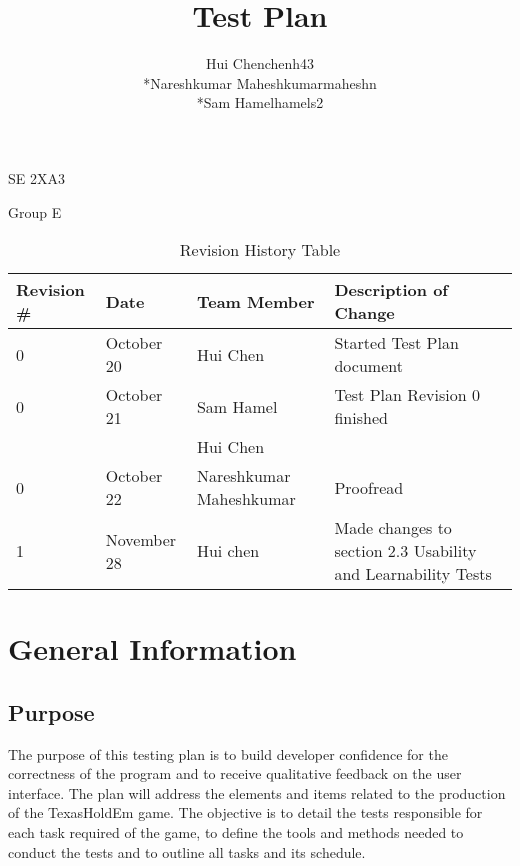 \documentclass[12pt]{article}
\begin{document}
	\begin{titlepage}
	\title {Test Plan}
	\maketitle
		\begin{center}
		SE 2XA3\\
		\author{
		Hui Chen\hspace{128pt}chenh43	
		\\*Nareshkumar Maheshkumar\hspace{35pt}maheshn 
		\\*Sam Hamel\hspace{118pt}hamels2 \\
		}

		Group E
		\end{center}
	\end{titlepage}
	
	\newpage
	\tableofcontents
	\listoftables
	
	\newpage
	\begin{table}[h]
	\caption{Revision History Table}
	\begin{tabular}{|p{1.5cm}|l|p{3cm}|p{6cm}|}
  	\hline
  	Revision \# & Date & Team Member & Description of Change\\
  	\hline
  	0 & October 20 & Hui Chen & Started Test Plan document\\
  	\hline
  	0 & October 21 & Sam Hamel  & Test Plan Revision 0 finished\\
  	 & & Hui Chen & \\
  	\hline
  	0 & October 22 & Nareshkumar Maheshkumar & Proofread\\
  	\hline
  	1 & November 28 & Hui chen & Made changes to section 2.3 Usability and Learnability Tests\\
  	\hline
	\end{tabular}
	\end{table}
	\newpage
	
	\section{General Information}
	\subsection{Purpose}    
	The purpose of this testing plan is to build developer confidence for the correctness of the program and to receive qualitative feedback on the user interface. The plan will address the elements and items related to the production of the TexasHoldEm game. The objective is to detail the tests responsible for each task required of the game, to define the tools and methods needed to conduct the tests and to outline all tasks and its schedule. 
\end{document}
